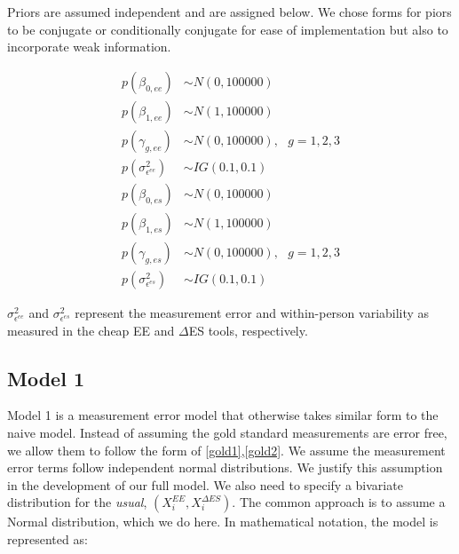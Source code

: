 \documentclass[11pt]{article}\usepackage[]{graphicx}\usepackage[]{color}
\begin{document}
Priors are assumed independent and are assigned below. We chose forms for piors to be conjugate or conditionally conjugate for ease of implementation but also to incorporate weak information. 

\begin{multicols}{2}
\noindent 
\begin{align}
p(\beta_{0,ee}) &\sim N(0,100000) \\
p(\beta_{1,ee}) &\sim N(1,100000) \\
p(\gamma_{g,ee}) &\sim N(0,100000), \text{ } g=1,2,3 \\
p(\sigma^2_{\epsilon^{ee}}) &\sim IG(0.1,0.1) 
\end{align}
\columnbreak
\begin{align}
p(\beta_{0,es}) &\sim N(0,100000) \\
p(\beta_{1,es}) &\sim N(1,100000) \\
p(\gamma_{g,es}) &\sim N(0,100000), \text{ } g=1,2,3 \\
p(\sigma^2_{\epsilon^{es}}) &\sim IG(0.1,0.1) 
\end{align}
\end{multicols}

$\sigma^2_{\epsilon^{ee}}$ and $\sigma^2_{\epsilon^{es}}$ represent the measurement error and within-person variability as measured in the cheap EE and $\Delta$ES tools, respectively. 


\subsection{Model 1}
Model 1 is a measurement error model that otherwise takes similar form to the naive model. Instead of assuming the gold standard measurements are error free, we allow them to follow the form of \eqref{gold1},\eqref{gold2}. We assume the measurement error terms follow independent normal distributions. We justify this assumption in the development of our full model. We also need to specify a bivariate distribution for the \emph{usual}, $(X_i^{EE},X_i^{\Delta ES})$. The common approach is to assume a Normal distribution, which we do here. In mathematical notation, the model is represented as:
\end{document}
